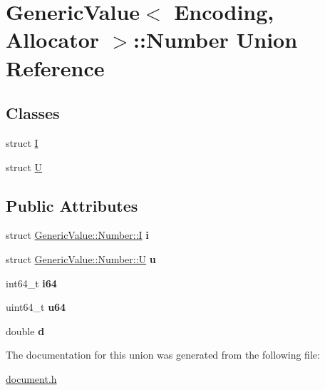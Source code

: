 \hypertarget{a02096}{}\section{Generic\+Value$<$ Encoding, Allocator $>$\+:\+:Number Union Reference}
\label{a02096}
\subsection*{Classes}
\begin{DoxyCompactItemize}
\item 
struct \hyperlink{a02100}{I}
\item 
struct \hyperlink{a02104}{U}
\end{DoxyCompactItemize}
\subsection*{Public Attributes}
\begin{DoxyCompactItemize}
\item 
\mbox{\label{a02096_a0593fffc72a240979606668179e94436}} 
struct \hyperlink{a02100}{Generic\+Value\+::\+Number\+::I} {\bfseries i}
\item 
\mbox{\label{a02096_a3b5f0986718c830b88d641491248131d}} 
struct \hyperlink{a02104}{Generic\+Value\+::\+Number\+::U} {\bfseries u}
\item 
\mbox{\label{a02096_ae53d96a8ead92099541da3b71633b77b}} 
int64\+\_\+t {\bfseries i64}
\item 
\mbox{\label{a02096_a1c8d3c6d226cf74315e233b30b622430}} 
uint64\+\_\+t {\bfseries u64}
\item 
\mbox{\label{a02096_a7ca3ad492fff303586d241eb0d17c242}} 
double {\bfseries d}
\end{DoxyCompactItemize}


The documentation for this union was generated from the following file\+:\begin{DoxyCompactItemize}
\item 
\hyperlink{a00476}{document.\+h}\end{DoxyCompactItemize}
